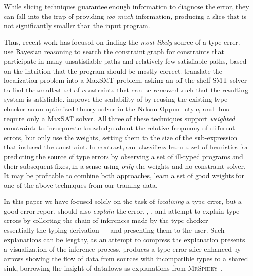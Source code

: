 While slicing techniques guarantee enough information to diagnose the
error, they can fall into the trap of providing \emph{too much}
information, producing a slice that is not significantly smaller than
the input program.

Thus, recent work has focused on finding the \emph{most likely} source
of a type error.
%
\citet{Zhang2014-lv} use Bayesian reasoning to search the constraint
graph for constraints that participate in many unsatisfiable paths and
relatively few satisfiable paths, based on the intuition that the
program should be mostly correct.
%
\citet{Pavlinovic2014-mr} translate the localization problem into a
MaxSMT problem, asking an off-the-shelf SMT solver to find the smallest
set of constraints that can be removed such that the resulting system is
satisfiable.
%
\citet{Loncaric2016-uk} improve the scalability of
\citeauthor{Pavlinovic2014-mr} by reusing the existing type checker as
an optimized theory solver in the Nelson-Oppen~\citeyear{Nelson1979-td}
style, and thus require only a MaxSAT solver.
%
All three of these techniques support \emph{weighted} constraints to
incorporate knowledge about the relative frequency of different errors,
but only \citeauthor{Pavlinovic2014-mr} use the weights, setting them to
the size of the sub-expression that induced the constraint.
%
In contrast, our classifiers learn a set of heuristics for predicting
the source of type errors by observing a set of ill-typed programs and
their subsequent fixes, in a sense using \emph{only} the weights and no
constraint solver.
%
It may be profitable to combine both approaches, \ie learn a set of good
weights for one of the above techniques from our training data.

In this paper we have focused solely on the task of \emph{localizing} a
type error, but a good error report should also \emph{explain} the
error.
%
\citet{Wand1986-nw}, \citet{Beaven1993-hb}, and \citet{Duggan1996-by}
attempt to explain type errors by collecting the chain of inferences
made by the type checker --- essentially the typing derivation --- and
presenting them to the user.
%
Such explanations can be lengthy, as an attempt to compress the
explanation \citet{Yang2000-kz} presents a visualization of the
inference process.
%
\citet{Gast2004-zd} produces a type error slice enhanced by arrows
showing the flow of data from sources with incompatible types to a
shared sink, borrowing the insight of dataflows-as-explanations from
\textsc{MrSpidey}~\citep{Flanagan1996-bu}.

